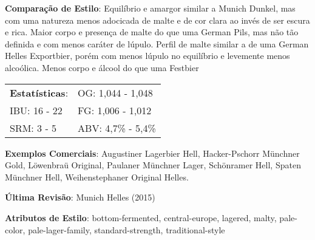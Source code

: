 \textbf{Comparação de Estilo}: Equilíbrio e amargor similar a Munich Dunkel, mas com uma natureza menos adocicada de malte e de cor clara ao invés de ser escura e rica. Maior corpo e presença de malte do que uma German Pils, mas não tão definida e com menos caráter de lúpulo. Perfil de malte similar a de uma German Helles Exportbier, porém com menos lúpulo no equilíbrio e levemente menos alcoólica. Menos corpo e álcool do que uma Festbier

\begin{tabular}{@{}p{35mm}p{35mm}@{}}
  \textbf{Estatísticas}: & OG: 1,044 - 1,048 \\
  IBU: 16 - 22  & FG: 1,006 - 1,012  \\
  SRM: 3 - 5   & ABV: 4,7\% - 5,4\%
\end{tabular}

\textbf{Exemplos Comerciais}: Augustiner Lagerbier Hell, Hacker-Pschorr Münchner Gold, Löwenbraü Original, Paulaner Münchner Lager, Schönramer Hell, Spaten Münchner Hell, Weihenstephaner Original Helles.

\textbf{Última Revisão}: Munich Helles (2015)

\textbf{Atributos de Estilo}: bottom-fermented, central-europe, lagered, malty, pale-color, pale-lager-family, standard-strength, traditional-style
